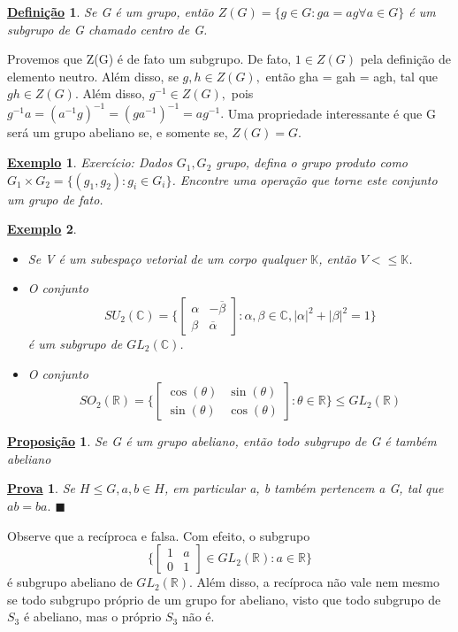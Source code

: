 \documentclass{article}
\newtheorem*{def*}{\underline{Defini\c c\~ao}}
\newtheorem*{prop*}{\underline{Proposi\c c\~ao}}
\newtheorem{example*}{\underline{Exemplo}}
\newtheorem*{proof*}{\underline{Prova}}
\renewcommand\qedsymbol{$\blacksquare$}
\begin{document}
 \begin{def*}
   Se G \'e um grupo, ent\~ao $Z(G) = \{g\in G: ga = ag\forall a\in{G}\} $ \'e um subgrupo de G chamado centro de G.
 \end{def*}
  Provemos que Z(G) \'e de fato um subgrupo. De fato, $1\in Z(G)$ pela defini\c c\~ao de elemento neutro. Al\'em disso, se $g, h\in Z(G),$
ent\~ao gha = gah = agh, tal que $gh\in Z(G).$ Al\'em disso, $g^{-1}\in Z(G),$ pois $g^{-1}a = (a^{-1}g)^{-1} = (ga^{-1})^{-1} = ag^{-1}.$
  Uma propriedade interessante \'e que G ser\'a um grupo abeliano se, e somente se, $Z(G) = G.$ 
 \begin{example*}
 Exerc\'icio: Dados $G_{1}, G_{2}$ grupo, defina o grupo produto como $G_{1}\times G_{2} = \{(g_{1}, g_{2}): g_{i}\in G_{i}\}$. Encontre
uma opera\c c\~ao que torne este conjunto um grupo de fato.
 \end{example*}
 \begin{example*}
  \begin{itemize}
    \item[1)]  Se V \'e um subespa\c co vetorial de um corpo qualquer $\mathbb{K}$, ent\~ao $V<\leq{\mathbb{K}}$.  
    \item[2)] O conjunto 
      $$
      SU_{2}(\mathbb{C}) = \biggl\{ \begin{bmatrix}
          \alpha & -\overline{\beta} \\
          \beta & \overline{\alpha}
    \end{bmatrix}: \alpha, \beta \in \mathbb{C}, |\alpha|^{2} + |\beta|^{2} = 1\biggr\} 
    $$
    \'e um subgrupo de $GL_{2}(\mathbb{C})$.
    \item[3)] O conjunto
      $$
      SO_{2}(\mathbb{R}) = \biggl\{\begin{bmatrix}
          \cos{(\theta)} & \sin{(\theta)}\\
          \sin{(\theta)} & \cos{(\theta)}
      \end{bmatrix}: \theta\in \mathbb{R}\biggr\} \leq{GL_{2}(\mathbb{R})}
      $$
  \end{itemize}
 \end{example*}
\begin{prop*}
  Se G \'e um grupo abeliano, ent\~ao todo subgrupo de G \'e tamb\'em abeliano
\end{prop*}
\begin{proof*}
  Se $H\leq{G}, a, b\in H$, em particular a, b tamb\'em pertencem a G, tal que $ab = ba.$ \qedsymbol
\end{proof*}
  Observe que a rec\'iproca e falsa. Com efeito, o subgrupo 
  $$
  \biggl\{\begin{bmatrix}
      1 & a \\
      0 & 1
    \end{bmatrix}\in GL_{2}(\mathbb{R}): a\in \mathbb{R}\biggr\}
  $$
  \'e subgrupo abeliano de $GL_{2}(\mathbb{R}).$ Al\'em disso, a rec\'iproca n\~ao vale nem mesmo se todo subgrupo pr\'oprio de um
grupo for abeliano, visto que todo subgrupo de $S_{3}$ \'e abeliano, mas o pr\'oprio $S_{3}$ n\~ao \'e.
\end{document}
